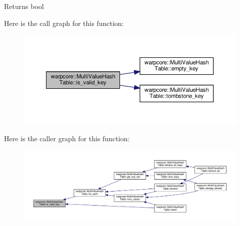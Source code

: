 \begin{DoxyReturn}{Returns}
{\ttfamily bool} 
\end{DoxyReturn}
Here is the call graph for this function\+:
\nopagebreak
\begin{figure}[H]
\begin{center}
\leavevmode
\includegraphics[width=350pt]{classwarpcore_1_1MultiValueHashTable_a130e94f97c0002895317f086442e8470_cgraph}
\end{center}
\end{figure}
Here is the caller graph for this function\+:
\nopagebreak
\begin{figure}[H]
\begin{center}
\leavevmode
\includegraphics[width=350pt]{classwarpcore_1_1MultiValueHashTable_a130e94f97c0002895317f086442e8470_icgraph}
\end{center}
\end{figure}
\mbox{\label{classwarpcore_1_1MultiValueHashTable_a8abd31b493048670295af663d50d1c9e}} 

